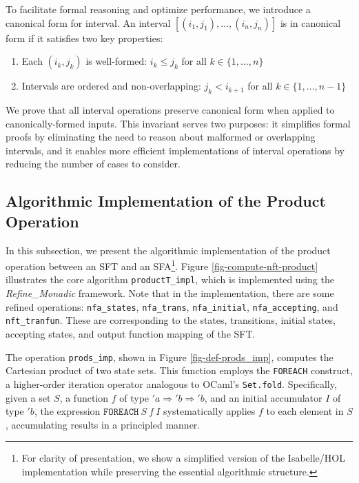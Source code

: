 \documentclass[a4paper,UKenglish,cleveref, autoref, thm-restate]{lipics-v2021}
\begin{document}
To facilitate formal reasoning and optimize performance, we introduce a canonical form for interval. An interval $[(i_1, j_1), \ldots, (i_n, j_n)]$ is in canonical form if it satisfies two key properties:
\begin{enumerate}
  \item Each $(i_k, j_k)$ is well-formed: $i_k \leq j_k$ for all $k \in \{1,\ldots,n\}$
  \item Intervals are ordered and non-overlapping: $j_k < i_{k+1}$ for all $k \in \{1,\ldots,n-1\}$
\end{enumerate}

We prove that all interval operations preserve canonical form when applied to canonically-formed inputs. This invariant serves two purposes: it simplifies formal proofs by eliminating the need to reason about malformed or overlapping intervals, and it enables more efficient implementations of interval operations by reducing the number of cases to consider.



\subsection{Algorithmic Implementation of the Product Operation}

In this subsection, we present the algorithmic implementation of the product operation between an SFT and an SFA\footnote{For clarity of presentation, we show a simplified version of the Isabelle/HOL implementation while preserving the essential algorithmic structure.}. 
%
Figure \ref{fig-compute-nft-product} illustrates the core algorithm \texttt{productT\_impl}, which is implemented using the \emph{Refine\_Monadic} framework. Note that in the implementation, there are some refined operations: \texttt{nfa\_states}, \texttt{nfa\_trans}, \texttt{nfa\_initial}, \texttt{nfa\_accepting}, and \texttt {nft\_tranfun}. These are corresponding to the states, transitions, initial states, accepting states, and output function mapping of the SFT.

The operation \texttt{prods\_imp}, shown in Figure \ref{fig-def-prods_imp}, computes the Cartesian product of two state sets. This function employs the \texttt{FOREACH} construct, a higher-order iteration operator analogous to OCaml's \texttt{Set.fold}. Specifically, given a set $S$, a function $f$ of type $'a \Rightarrow 'b \Rightarrow 'b$, and an initial accumulator $I$ of type $'b$, the expression $\texttt{FOREACH}~S~f~I$ systematically applies $f$ to each element in $S$, accumulating results in a principled manner.
\end{document}

